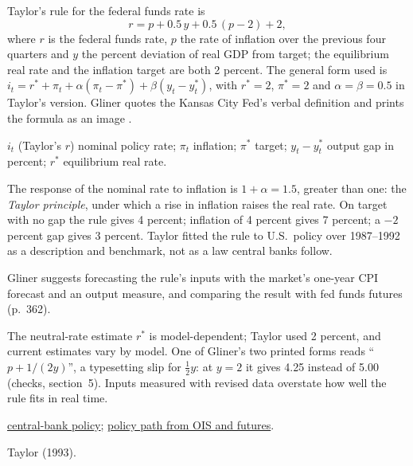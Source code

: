 \begin{qfmodel}\label{mod:taylor-rule}
 Taylor's rule for the federal funds rate is \citep[p.~202, eq.~(1)]{taylor-1993}
\[ r=p+0.5\,y+0.5\,(p-2)+2, \]
where $r$ is the federal funds rate, $p$ the rate of inflation over the previous four quarters and $y$ the percent deviation of real GDP from target; the equilibrium real rate and the inflation target are both 2 percent. The general form used is $i_t=r^*+\pi_t+\alpha(\pi_t-\pi^*)+\beta(y_t-y^*_t)$, with $r^*=2$, $\pi^*=2$ and $\alpha=\beta=0.5$ in Taylor's version. Gliner quotes the Kansas City Fed's verbal definition and prints the formula as an image \citep[chap.~11, sec.\ ``Taylor Rule'', PDF pp.~361--362]{s7-gliner}.

 $i_t$ (Taylor's $r$) nominal policy rate; $\pi_t$ inflation; $\pi^*$ target; $y_t-y^*_t$ output gap in percent; $r^*$ equilibrium real rate.

 The response of the nominal rate to inflation is $1+\alpha=1.5$, greater than one: the \emph{Taylor principle}, under which a rise in inflation raises the real rate. On target with no gap the rule gives 4 percent; inflation of 4 percent gives 7 percent; a $-2$ percent gap gives 3 percent. Taylor fitted the rule to U.S.\ policy over 1987--1992 as a description and benchmark, not as a law central banks follow.

 Gliner suggests forecasting the rule's inputs with the market's one-year CPI forecast and an output measure, and comparing the result with fed funds futures (p.~362).

 The neutral-rate estimate $r^*$ is model-dependent; Taylor used 2 percent, and current estimates vary by model. One of Gliner's two printed forms reads ``$p+1/(2y)$'', a typesetting slip for $\tfrac12 y$: at $y=2$ it gives 4.25 instead of 5.00 (checks, section~5). Inputs measured with revised data overstate how well the rule fits in real time.

 \hyperref[def:central-bank-policy-framework]{central-bank policy}; \hyperref[meth:policy-path-ois-futures]{policy path from OIS and futures}.

 Taylor (1993).

\end{qfmodel}

